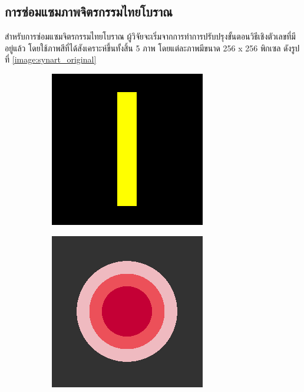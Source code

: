\documentclass[hidelinks, a4paper,12pt]{article}
\numberwithin{equation}{section}							%
\numberwithin{equation}{section}
\begin{document}
{	\subsection{การซ่อมแซมภาพจิตรกรรมไทยโบราณ}
	\hspace{1cm} สำหรับการซ่อมแซมจิตรกรรมไทยโบราณ ผู้วิจัยจะเริ่มจากการทำการปรับปรุงขั้นตอนวิธีเชิงตัวเลขที่มีอยู่แล้ว โดยใช้ภาพสีที่ได้สังเคราะห์ขึ้นทั้งสิ้น 5 ภาพ โดยแต่ละภาพมีขนาด 256 x 256 พิกเซล ดังรูปที่ \ref{image:synart_original}
	\begin{figure}[H]
		\centering
		\begin{subfigure}{0.4\linewidth}
			\centering
			\includegraphics[width=0.8\linewidth]{images/image_inpaint_synthetic/case01-original.png}
		\end{subfigure}
		\begin{subfigure}{0.4\linewidth}
			\centering
			\includegraphics[width=0.8\linewidth]{images/image_inpaint_synthetic/case02-original.png}

\end{subfigure}
\end{figure}}
\end{document}
